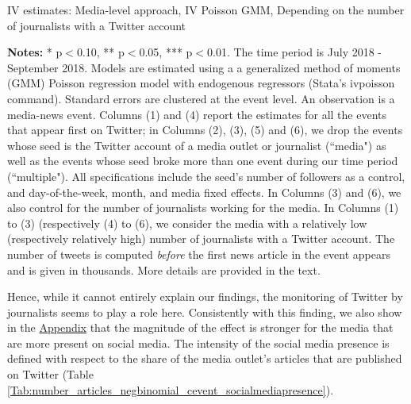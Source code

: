 \begin{table}
\caption{IV estimates: Media-level approach, IV Poisson GMM, Depending on the number of journalists with a Twitter account}
\begin{center}
	
\end{center}
\begin{spacing}{0.5}
	{\fns \textbf{Notes:} * p$<$0.10, ** p$<$0.05, *** p$<$0.01. The time period is July 2018 - September 2018. Models are estimated using a a generalized method of moments (GMM) Poisson regression model with endogenous regressors (Stata's ivpoisson command). Standard errors are clustered at the event level. An observation is a media-news event. Columns (1) and (4) report the estimates for all the events that appear first on Twitter; in Columns (2), (3), (5) and (6), we drop the events whose seed is the Twitter account of a media outlet or journalist (``media") as well as the events whose seed broke more than one event during our time period (``multiple"). All specifications include the seed's number of followers as a control, and day-of-the-week, month, and media fixed effects. In Columns (3) and (6), we also control for the number of journalists working for the media. In Columns (1) to (3) (respectively (4) to (6), we consider the media with a relatively low (respectively relatively high) number of journalists with a Twitter account. The number of tweets is computed \textit{before} the first news article in the event appears and is given in thousands. More details are provided in the text.} 
\end{spacing}
\label{Tab:regression_media_IV_Poisson_GMM_heterogeneity_nb_journalist_accounts}
\end{table} 


Hence, while it cannot entirely explain our findings, the monitoring of Twitter by journalists seems to play a role here. Consistently with this finding, we also show in the \hyperlink{ref:Appendix}{Appendix} that the magnitude of the effect is stronger for the media that are more present on social media. The intensity of the social media presence is defined with respect to the share of the media outlet's articles that are published on Twitter (Table \ref{Tab:number_articles_negbinomial_cevent_socialmediapresence}).


